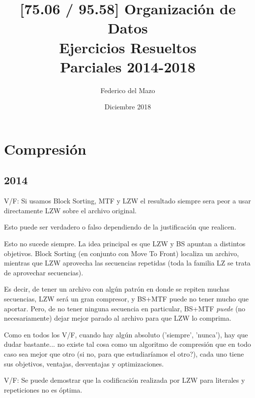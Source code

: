 \documentclass[a4paper]{article}
\title{[75.06 / 95.58] Organización de Datos \\ \textbf{Ejercicios Resueltos} \\ \Large Parciales 2014-2018}
\author{Federico del Mazo}
\date{Diciembre 2018}
\newenvironment{enunciado}[3]{%
    \vspace{\baselineskip}
    \tcolorbox[beamer,%
    noparskip,breakable,
    colback=LightGreen,colframe=DarkGreen,%
    colbacklower=LimeGreen!75!LightGreen,%
    title=\small Enunciado: Año #1\, Cuatrimestre #2\, Oportunidad #3]}%
    {\endtcolorbox}
\newenvironment{criterio}[3]{%
    \tcolorbox[beamer,%
    noparskip,breakable,
    colback=LightCoral,colframe=DarkRed,%
    colbacklower=Tomato!75!LightCoral,%
    title=\small Criterio de Corrección: Año #1\, Cuatrimestre #2\, Oportunidad #3]}%
    {\endtcolorbox}
\begin{document}
    \maketitle
    \thispagestyle{empty}

    \tableofcontents
    \newpage


    \section{Compresión}

    \subsection{2014}

    \begin{enunciado}{2014}{1}{2}
        V/F: Si usamos Block Sorting, MTF y LZW el resultado siempre sera peor a usar directamente LZW sobre el archivo original.  
    \end{enunciado}

    \begin{criterio}{2014}{1}{2}
        Esto puede ser verdadero o falso dependiendo de la justificación que realicen.     
    \end{criterio}

    Esto no sucede siempre. La idea principal es que LZW y BS apuntan a distintos objetivos. Block Sorting (en conjunto con Move To Front) localiza un archivo, mientras que LZW aprovecha las secuencias repetidas (toda la familia LZ se trata de aprovechar secuencias). 
    
    Es decir, de tener un archivo con algún patrón en donde se repiten muchas secuencias, LZW será un gran compresor, y BS+MTF puede no tener mucho que aportar. Pero, de no tener ninguna secuencia en particular, BS+MTF \textit{puede} (no necesariamente) dejar mejor parado al archivo para que LZW lo comprima.

    Como en todos los V/F, cuando hay algún absoluto ('siempre', 'nunca'), hay que dudar bastante... no existe tal cosa como un algoritmo de compresión que en todo caso sea mejor que otro (si no, para que estudiaríamos el otro?), cada uno tiene sus objetivos, ventajas, desventajas y optimizaciones.

    \begin{enunciado}{2014}{1}{2}
        V/F: Se puede demostrar que la codificación realizada por LZW para literales y repeticiones no es óptima.
    \end{enunciado}
\end{document}
